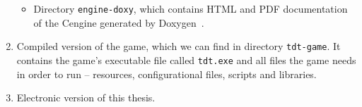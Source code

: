 \documentclass[12pt,a4paper]{report}
\let\openright=\clearpage
\def\cpp{{C\nolinebreak[4]\hspace{-.05em}\raisebox{.4ex}{\tiny\bf ++\xspace}}}
\begin{document}
\begin{enumerate}[label=\textbf{\Alph*.}]
\begin{itemize}
            \item Directory \texttt{engine-doxy}, which contains HTML and PDF documentation of the \cpp engine generated by
                Doxygen~\cite{doxy}.
        \end{itemize}
    \item Compiled version of the game, which we can find in directory \texttt{tdt-game}. It contains the game's executable file
        called \texttt{tdt.exe} and all files the game needs in order to run -- resources, configurational files, scripts and libraries.
    \item Electronic version of this thesis.
\end{enumerate}

\openright
\end{document}
